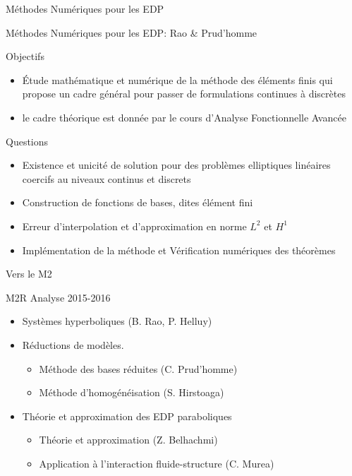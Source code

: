 \documentclass{beamer}
\begin{document}
\begin{frame}{Méthodes Numériques pour les EDP}




\end{frame}
\begin{frame}{Méthodes Numériques pour les EDP: Rao \& Prud'homme}
  \begin{block}{Objectifs}
    \begin{itemize}
    \item Étude mathématique et numérique de la méthode des éléments
      finis qui propose un cadre général pour passer de formulations
      continues à discrètes
    \item le cadre théorique est donnée par le cours d'Analyse
      Fonctionnelle Avancée
    \end{itemize}
  \end{block}
  \begin{block}{Questions}
    \begin{itemize}
    \item Existence et unicité de solution pour des problèmes
      elliptiques linéaires coercifs au niveaux continus et discrets
    \item Construction de fonctions de bases, dites élément fini
    \item Erreur d'interpolation et d'approximation en norme $L^2$ et $H^1$
    \item Implémentation de la méthode et Vérification numériques des théorèmes
    \end{itemize}
  \end{block}
\end{frame}

\begin{frame}{Vers le M2}

  \begin{block}{M2R Analyse 2015-2016}
    \begin{itemize}
    \item Systèmes hyperboliques (B. Rao, P. Helluy)
    \item Réductions de modèles.
      \begin{itemize}
      \item Méthode des bases réduites (C. Prud'homme)
      \item Méthode d'homogénéisation (S. Hirstoaga)
      \end{itemize}
    \item Théorie et approximation des EDP paraboliques
      \begin{itemize}
      \item Théorie et approximation (Z. Belhachmi)
      \item Application à l'interaction
        fluide-structure (C. Murea)
      \end{itemize}
    \end{itemize}
  \end{block}

\end{frame}
\end{document}
